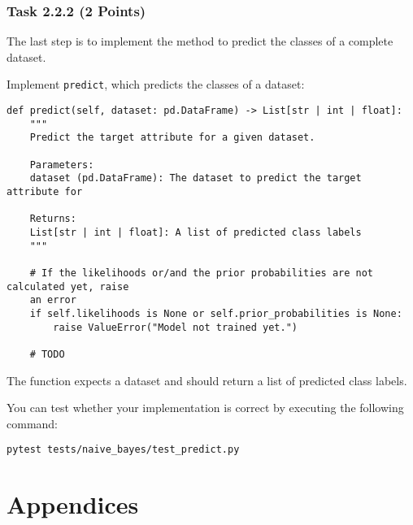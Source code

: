 \documentclass[
english,
smallborders
]{i6prcsht}
\newcommand{\points}[1]{\hfill \color{red}(#1 Points)\color{black}}
\begin{document}
\subsubsection*{Task 2.2.2 \points{2}}

The last step is to implement the method to predict the classes of a complete dataset.

Implement \texttt{predict}, which predicts the classes of a dataset:

\vspace*{0.3cm}

\begin{lstlisting}
def predict(self, dataset: pd.DataFrame) -> List[str | int | float]:
	"""
	Predict the target attribute for a given dataset.

	Parameters:
	dataset (pd.DataFrame): The dataset to predict the target attribute for

	Returns:
	List[str | int | float]: A list of predicted class labels
	"""

	# If the likelihoods or/and the prior probabilities are not calculated yet, raise
	an error
	if self.likelihoods is None or self.prior_probabilities is None:
		raise ValueError("Model not trained yet.")

	# TODO
\end{lstlisting}

\vspace*{0.1cm}

The function expects a dataset and should return a list of predicted class labels.

You can test whether your implementation is correct by executing the following command:

\vspace*{0.3cm}

\begin{lstlisting}
pytest tests/naive_bayes/test_predict.py
\end{lstlisting}

\vspace*{0.1cm}











\newpage

\section*{Appendices}
\end{document}
